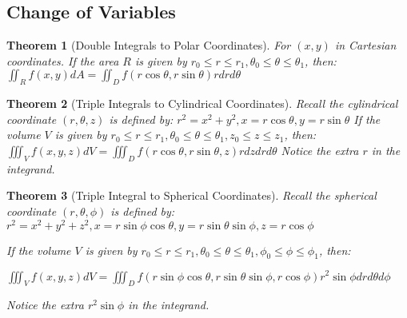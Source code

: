 \documentclass[9pt]{article}
\newtheorem{theorem}{Theorem}[subsection]
\theoremstyle{definition}
\theoremstyle{remark}
\begin{document}
\subsection{Change of Variables}
\begin{theorem}[Double Integrals to Polar Coordinates]
For $(x, y)$ in Cartesian coordinates. If the area $R$ is given by $r_0 \leq r \leq r_1, \theta_0 \leq \theta \leq \theta_1$, then:
$
	\iint_R f(x,y) dA = \iint_D f(r\cos{\theta}, r\sin{\theta}) r dr d\theta
$
\end{theorem}

\begin{theorem}[Triple Integrals to Cylindrical Coordinates]
Recall the cylindrical coordinate $(r, \theta, z)$ is defined by: $r^2 = x^2+y^2, x = r\cos{\theta}, y = r\sin{\theta}$
If the volume $V$ is given by $r_0 \leq r \leq r_1, \theta_0 \leq \theta \leq \theta_1, z_0 \leq z \leq z_1$, then:
$
	\iiint_V f(x,y,z) dV = \iiint_D f(r\cos{\theta}, r\sin{\theta}, z) r dz dr d\theta
$
Notice the extra $r$ in the integrand.
\end{theorem}

\begin{theorem}[Triple Integral to Spherical Coordinates]
Recall the spherical coordinate
$(r, \theta, \phi)$
is defined by: $r^2 = x^2+y^2+z^2, x = r\sin{\phi}\cos{\theta}, y = r\sin{\theta}\sin{\phi}, z = r\cos{\phi}$

If the volume $V$ is given by $r_0 \leq r \leq r_1, \theta_0 \leq \theta \leq \theta_1, \phi_0 \leq \phi \leq \phi_1$, then:

$
	\iiint_V f(x,y,z) dV = \iiint_D f(r\sin{\phi}\cos{\theta}, r\sin{\theta}\sin{\phi}, r\cos{\phi}) r^2 \sin{\phi} dr d\theta d\phi
$

Notice the extra $r^2 \sin{\phi}$ in the integrand.
\end{theorem}
\end{document}
